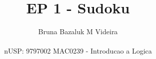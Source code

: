 \documentclass[12pt]{article}
\begin{document}
\title{EP 1 - Sudoku}%
\author{Bruna Bazaluk M Videira\\ %
\\ nUSP: 9797002
MAC0239 - Introducao a Logica} %
 
\maketitle
\end{document}
